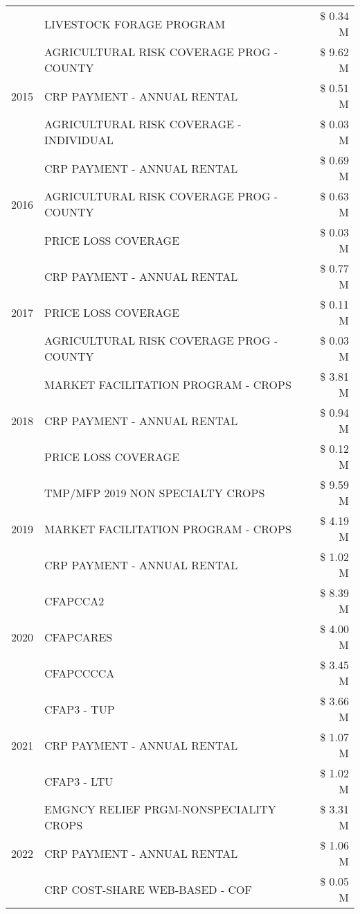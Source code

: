 \begin{tabular}{llr}
 & LIVESTOCK FORAGE PROGRAM & \$ 0.34 M \\
\cline{1-3}
\multirow[t]{3}{*}{2015} & AGRICULTURAL RISK COVERAGE PROG - COUNTY & \$ 9.62 M \\
 & CRP PAYMENT - ANNUAL RENTAL & \$ 0.51 M \\
 & AGRICULTURAL RISK COVERAGE - INDIVIDUAL & \$ 0.03 M \\
\cline{1-3}
\multirow[t]{3}{*}{2016} & CRP PAYMENT - ANNUAL RENTAL & \$ 0.69 M \\
 & AGRICULTURAL RISK COVERAGE PROG - COUNTY & \$ 0.63 M \\
 & PRICE LOSS COVERAGE & \$ 0.03 M \\
\cline{1-3}
\multirow[t]{3}{*}{2017} & CRP PAYMENT - ANNUAL RENTAL & \$ 0.77 M \\
 & PRICE LOSS COVERAGE & \$ 0.11 M \\
 & AGRICULTURAL RISK COVERAGE PROG - COUNTY & \$ 0.03 M \\
\cline{1-3}
\multirow[t]{3}{*}{2018} & MARKET FACILITATION PROGRAM - CROPS & \$ 3.81 M \\
 & CRP PAYMENT - ANNUAL RENTAL & \$ 0.94 M \\
 & PRICE LOSS COVERAGE & \$ 0.12 M \\
\cline{1-3}
\multirow[t]{3}{*}{2019} & TMP/MFP 2019 NON SPECIALTY CROPS & \$ 9.59 M \\
 & MARKET FACILITATION PROGRAM - CROPS & \$ 4.19 M \\
 & CRP PAYMENT - ANNUAL RENTAL & \$ 1.02 M \\
\cline{1-3}
\multirow[t]{3}{*}{2020} & CFAPCCA2 & \$ 8.39 M \\
 & CFAPCARES & \$ 4.00 M \\
 & CFAPCCCCA & \$ 3.45 M \\
\cline{1-3}
\multirow[t]{3}{*}{2021} & CFAP3 - TUP & \$ 3.66 M \\
 & CRP PAYMENT - ANNUAL RENTAL & \$ 1.07 M \\
 & CFAP3 - LTU & \$ 1.02 M \\
\cline{1-3}
\multirow[t]{3}{*}{2022} & EMGNCY RELIEF PRGM-NONSPECIALITY CROPS & \$ 3.31 M \\
 & CRP PAYMENT - ANNUAL RENTAL & \$ 1.06 M \\
 & CRP COST-SHARE WEB-BASED - COF & \$ 0.05 M \\
\cline{1-3}
\bottomrule
\end{tabular}
